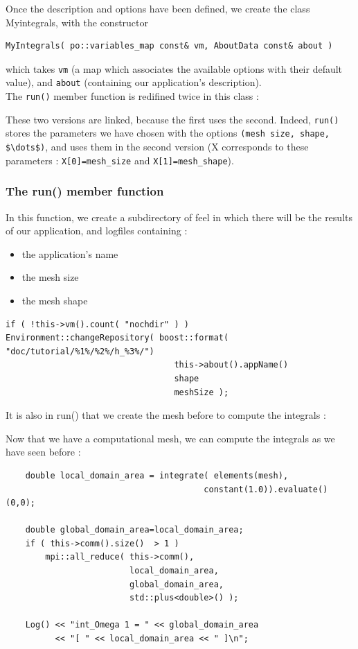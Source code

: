 Once the description and options have been defined, we create the class Myintegrals, with the constructor \\
\begin{lstlisting}
MyIntegrals( po::variables_map const& vm, AboutData const& about )
\end{lstlisting}
which takes \lstinline!vm! (a map which associates the available options with their default value), and \lstinline!about! (containing our application's description). \\

The \lstinline!run()! member function is redifined twice in this class :

These two versions are linked, because the first uses the second. Indeed, \lstinline!run()! stores the parameters we have chosen with the options \lstinline!(mesh size, shape, $\dots$)!, and uses them in the second version (X corresponds to these parameters : \lstinline!X[0]=mesh_size! and \lstinline!X[1]=mesh_shape!). \\

\subsubsection{The run() member function}
In this function, we create a subdirectory of feel in which there will be the results of our application, and logfiles containing :
\begin{itemize}
\item the application's name
\item the mesh size
\item the mesh shape
\end{itemize}

\begin{lstlisting}
if ( !this->vm().count( "nochdir" ) )
Environment::changeRepository( boost::format( "doc/tutorial/%1%/%2%/h_%3%/")
                                  this->about().appName()
                                  shape
                                  meshSize );

\end{lstlisting}

It is also in run() that we create the mesh before to compute the integrals :

Now that we have a computational mesh, we can compute the integrals as we have seen before :

\begin{lstlisting}
    double local_domain_area = integrate( elements(mesh),
                                        constant(1.0)).evaluate()(0,0);

    double global_domain_area=local_domain_area;
    if ( this->comm().size()  > 1 )
        mpi::all_reduce( this->comm(),
                         local_domain_area,
                         global_domain_area,
                         std::plus<double>() );

    Log() << "int_Omega 1 = " << global_domain_area
          << "[ " << local_domain_area << " ]\n";
\end{lstlisting}

